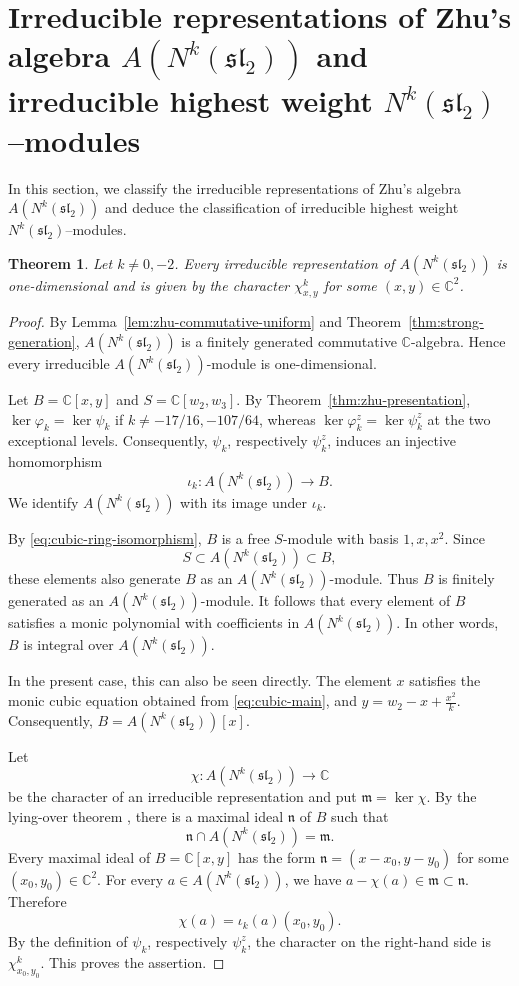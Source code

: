\documentclass[11 pt]{amsart}
\newtheorem{theorem}{Theorem}
\theoremstyle{definition}
\theoremstyle{plain}
\begin{document}
\section{Irreducible representations of Zhu's algebra
$A(N^k(\mathfrak{sl}_2))$ and irreducible highest weight
$N^k(\mathfrak{sl}_2)$--modules}
\label{sec:zhu-parametrization}
\label{sec:zhu-representations}
In this section, we classify the irreducible representations of Zhu's
algebra $A(N^k(\mathfrak{sl}_2))$ and deduce the classification of
irreducible highest weight $N^k(\mathfrak{sl}_2)$--modules.

\begin{theorem}\label{thm:zhu-parametrization}
Let $k\neq0,-2$.  Every irreducible representation of
$A(N^k(\mathfrak{sl}_2))$ is one-dimensional and is given by the
character $\chi^k_{x,y}$ for some $(x,y)\in\mathbb C^2$.
\end{theorem}

\begin{proof}
By Lemma~\ref{lem:zhu-commutative-uniform} and
Theorem~\ref{thm:strong-generation},
$A(N^k(\mathfrak{sl}_2))$ is a finitely generated
commutative $\mathbb C$-algebra. Hence every irreducible
$A(N^k(\mathfrak{sl}_2))$-module is one-dimensional.

Let $B=\mathbb C[x,y]$ and $S=\mathbb C[w_2,w_3]$. By
Theorem~\ref{thm:zhu-presentation},
$
\ker\varphi_k=\ker\psi_k
$
if $k\neq-17/16,-107/64$, whereas
$
\ker\varphi_k^z=\ker\psi_k^z
$
at the two exceptional levels. Consequently, $\psi_k$,
respectively $\psi_k^z$, induces an injective homomorphism
\[
\iota_k:A(N^k(\mathfrak{sl}_2))\longrightarrow B.
\]
We identify $A(N^k(\mathfrak{sl}_2))$ with its image under
$\iota_k$.

By \eqref{eq:cubic-ring-isomorphism}, $B$ is a free
$S$-module with basis $1,x,x^2$. Since
\[
S\subset A(N^k(\mathfrak{sl}_2))\subset B,
\]
these elements also generate $B$ as an
$A(N^k(\mathfrak{sl}_2))$-module. Thus $B$ is finitely
generated as an $A(N^k(\mathfrak{sl}_2))$-module. It follows
that every element of $B$ satisfies a monic polynomial with
coefficients in $A(N^k(\mathfrak{sl}_2))$. In other words,
$B$ is integral over $A(N^k(\mathfrak{sl}_2))$.

In the present case, this can also be seen directly. The
element $x$ satisfies the monic cubic equation obtained from
\eqref{eq:cubic-main}, and
$
y=w_2-x+\frac{x^2}{k}.
$
Consequently,
$
B=A(N^k(\mathfrak{sl}_2))[x].
$

Let
\[
\chi:A(N^k(\mathfrak{sl}_2))\longrightarrow\mathbb C
\]
be the character of an irreducible representation and put
$\mathfrak m=\ker\chi$. By the lying-over theorem
\cite[Corollary~5.8 and Theorem~5.10]{AtiyahMacdonald},
there is a maximal ideal $\mathfrak n$ of $B$ such that
\[
\mathfrak n\cap A(N^k(\mathfrak{sl}_2))=\mathfrak m.
\]
Every maximal ideal of $B=\mathbb C[x,y]$ has the form
$
\mathfrak n=(x-x_0,y-y_0)
$
for some $(x_0,y_0)\in\mathbb C^2$. For every
$a\in A(N^k(\mathfrak{sl}_2))$, we have
$a-\chi(a)\in\mathfrak m\subset\mathfrak n$. Therefore
\[
\chi(a)=\iota_k(a)(x_0,y_0).
\]
By the definition of $\psi_k$, respectively $\psi_k^z$, the
character on the right-hand side is $\chi^k_{x_0,y_0}$.
This proves the assertion.
\end{proof}
\end{document}
